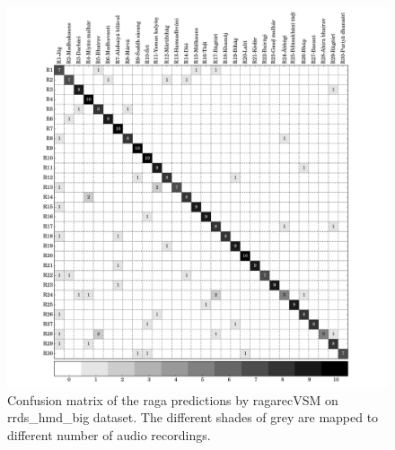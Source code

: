 \begin{figure}[h]
	\begin{center}
		\includegraphics[width=\figSizeNinety]{ch07_ragaRecognition/figures/CM_vsm_hmd_var1.pdf}
	\end{center}
	\caption{Confusion matrix of the \gls{raga} predictions by \acrshort{ragarecVSM} on \acrshort{rrds_hmd_big} dataset. The different shades of grey are mapped to different number of audio recordings.}
	\label{fig:confusion_matrix_hmd}
\end{figure}


